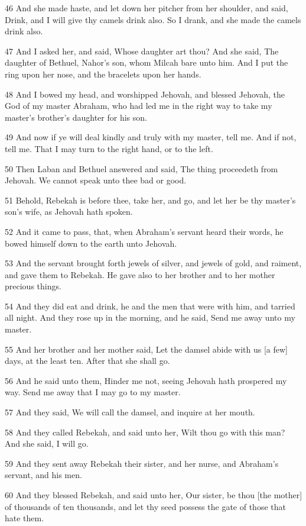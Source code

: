 \par 46 And she made haste, and let down her pitcher from her shoulder, and said, Drink, and I will give thy camels drink also. So I drank, and she made the camels drink also.
\par 47 And I asked her, and said, Whose daughter art thou? And she said, The daughter of Bethuel, Nahor's son, whom Milcah bare unto him. And I put the ring upon her nose, and the bracelets upon her hands.
\par 48 And I bowed my head, and worshipped Jehovah, and blessed Jehovah, the God of my master Abraham, who had led me in the right way to take my master's brother's daughter for his son.
\par 49 And now if ye will deal kindly and truly with my master, tell me. And if not, tell me. That I may turn to the right hand, or to the left.
\par 50 Then Laban and Bethuel answered and said, The thing proceedeth from Jehovah. We cannot speak unto thee bad or good.
\par 51 Behold, Rebekah is before thee, take her, and go, and let her be thy master's son's wife, as Jehovah hath spoken.
\par 52 And it came to pass, that, when Abraham's servant heard their words, he bowed himself down to the earth unto Jehovah.
\par 53 And the servant brought forth jewels of silver, and jewels of gold, and raiment, and gave them to Rebekah. He gave also to her brother and to her mother precious things.
\par 54 And they did eat and drink, he and the men that were with him, and tarried all night. And they rose up in the morning, and he said, Send me away unto my master.
\par 55 And her brother and her mother said, Let the damsel abide with us [a few] days, at the least ten. After that she shall go.
\par 56 And he said unto them, Hinder me not, seeing Jehovah hath prospered my way. Send me away that I may go to my master.
\par 57 And they said, We will call the damsel, and inquire at her mouth.
\par 58 And they called Rebekah, and said unto her, Wilt thou go with this man? And she said, I will go.
\par 59 And they sent away Rebekah their sister, and her nurse, and Abraham's servant, and his men.
\par 60 And they blessed Rebekah, and said unto her, Our sister, be thou [the mother] of thousands of ten thousands, and let thy seed possess the gate of those that hate them.

